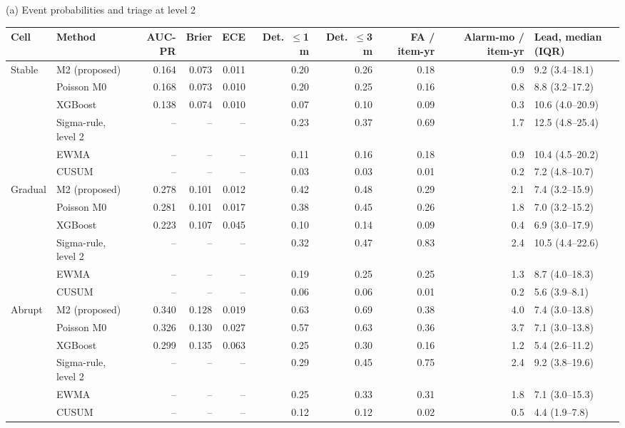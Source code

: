 \documentclass[10pt,a4paper]{article}
\begin{document}
{\scriptsize\centering
(a) Event probabilities and triage at level 2\\[2pt]
\begin{tabular}{llrrrrrrrl}
\toprule
Cell & Method & AUC-PR & Brier & ECE & Det.\ $\le$1 m & Det.\ $\le$3 m & FA / item-yr & Alarm-mo / item-yr & Lead, median (IQR) \\
\midrule
Stable & M2 (proposed) & 0.164 & 0.073 & 0.011 & 0.20 & 0.26 & 0.18 & 0.9 & 9.2 (3.4--18.1) \\
 & Poisson M0 & 0.168 & 0.073 & 0.010 & 0.20 & 0.25 & 0.16 & 0.8 & 8.8 (3.2--17.2) \\
 & XGBoost & 0.138 & 0.074 & 0.010 & 0.07 & 0.10 & 0.09 & 0.3 & 10.6 (4.0--20.9) \\
 & Sigma-rule, level 2 & -- & -- & -- & 0.23 & 0.37 & 0.69 & 1.7 & 12.5 (4.8--25.4) \\
 & EWMA & -- & -- & -- & 0.11 & 0.16 & 0.18 & 0.9 & 10.4 (4.5--20.2) \\
 & CUSUM & -- & -- & -- & 0.03 & 0.03 & 0.01 & 0.2 & 7.2 (4.8--10.7) \\
\addlinespace
Gradual & M2 (proposed) & 0.278 & 0.101 & 0.012 & 0.42 & 0.48 & 0.29 & 2.1 & 7.4 (3.2--15.9) \\
 & Poisson M0 & 0.281 & 0.101 & 0.017 & 0.38 & 0.45 & 0.26 & 1.8 & 7.0 (3.2--15.2) \\
 & XGBoost & 0.223 & 0.107 & 0.045 & 0.10 & 0.14 & 0.09 & 0.4 & 6.9 (3.0--17.9) \\
 & Sigma-rule, level 2 & -- & -- & -- & 0.32 & 0.47 & 0.83 & 2.4 & 10.5 (4.4--22.6) \\
 & EWMA & -- & -- & -- & 0.19 & 0.25 & 0.25 & 1.3 & 8.7 (4.0--18.3) \\
 & CUSUM & -- & -- & -- & 0.06 & 0.06 & 0.01 & 0.2 & 5.6 (3.9--8.1) \\
\addlinespace
Abrupt & M2 (proposed) & 0.340 & 0.128 & 0.019 & 0.63 & 0.69 & 0.38 & 4.0 & 7.4 (3.0--13.8) \\
 & Poisson M0 & 0.326 & 0.130 & 0.027 & 0.57 & 0.63 & 0.36 & 3.7 & 7.1 (3.0--13.8) \\
 & XGBoost & 0.299 & 0.135 & 0.063 & 0.25 & 0.30 & 0.16 & 1.2 & 5.4 (2.6--11.2) \\
 & Sigma-rule, level 2 & -- & -- & -- & 0.29 & 0.45 & 0.75 & 2.4 & 9.2 (3.8--19.6) \\
 & EWMA & -- & -- & -- & 0.25 & 0.33 & 0.31 & 1.8 & 7.1 (3.0--15.3) \\
 & CUSUM & -- & -- & -- & 0.12 & 0.12 & 0.02 & 0.5 & 4.4 (1.9--7.8) \\

\end{tabular}}
\end{document}
